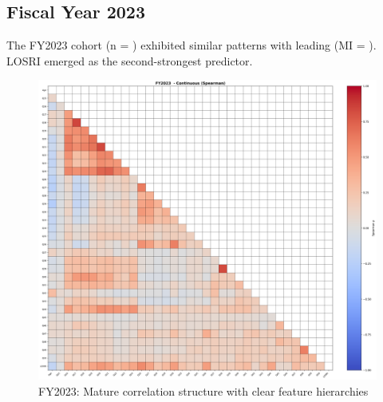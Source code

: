 \newpage

\subsection{Fiscal Year 2023}

The FY2023 cohort (n = \FSRecordsFinalFYTwoThousandTwentyThree) exhibited similar patterns with \FSTopFeatureFYTwoThousandTwentyThree{} leading (MI = \FSTopMIFYTwoThousandTwentyThree). LOSRI emerged as the second-strongest predictor.

\vspace*{\fill}
\begin{figure}[htbp]
\centering
\includegraphics[width=\textwidth]{fy2023_continuous_spearman.png}
\caption{FY2023: Mature correlation structure with clear feature hierarchies}
\end{figure}
\vspace*{\fill}

\newpage

